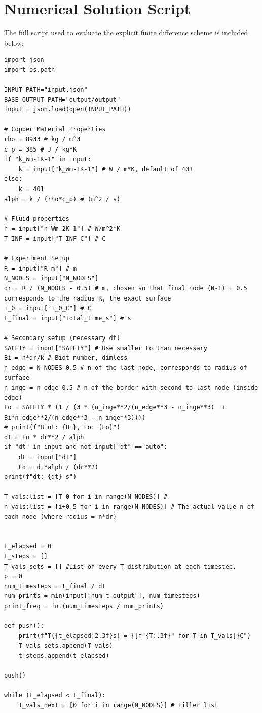 \documentclass[12pt]{article}
\begin{document}
\section{Numerical Solution Script}\label{app:efd-script}
The full \Python script used to evaluate the explicit finite difference scheme is included below:
\begin{verbatim}
import json
import os.path

INPUT_PATH="input.json"
BASE_OUTPUT_PATH="output/output"
input = json.load(open(INPUT_PATH))

# Copper Material Properties
rho = 8933 # kg / m^3
c_p = 385 # J / kg*K
if "k_Wm-1K-1" in input:
    k = input["k_Wm-1K-1"] # W / m*K, default of 401
else:
    k = 401
alph = k / (rho*c_p) # (m^2 / s)

# Fluid properties
h = input["h_Wm-2K-1"] # W/m^2*K
T_INF = input["T_INF_C"] # C

# Experiment Setup
R = input["R_m"] # m
N_NODES = input["N_NODES"]
dr = R / (N_NODES - 0.5) # m, chosen so that final node (N-1) + 0.5 corresponds to the radius R, the exact surface  
T_0 = input["T_0_C"] # C
t_final = input["total_time_s"] # s

# Secondary setup (necessary dt)
SAFETY = input["SAFETY"] # Use smaller Fo than necessary
Bi = h*dr/k # Biot number, dimless
n_edge = N_NODES-0.5 # n of the last node, corresponds to radius of surface
n_inge = n_edge-0.5 # n of the border with second to last node (inside edge)
Fo = SAFETY * (1 / (3 * (n_inge**2/(n_edge**3 - n_inge**3)  +  Bi*n_edge**2/(n_edge**3 - n_inge**3))))
# print(f"Biot: {Bi}, Fo: {Fo}")
dt = Fo * dr**2 / alph
if "dt" in input and not input["dt"]=="auto":
    dt = input["dt"]
    Fo = dt*alph / (dr**2)
print(f"dt: {dt} s")

T_vals:list = [T_0 for i in range(N_NODES)] #
n_vals:list = [i+0.5 for i in range(N_NODES)] # The actual value n of each node (where radius = n*dr)


t_elapsed = 0
t_steps = []
T_vals_sets = [] #List of every T distribution at each timestep.
p = 0
num_timesteps = t_final / dt
num_prints = min(input["num_t_output"], num_timesteps)
print_freq = int(num_timesteps / num_prints)

def push():
    print(f"T({t_elapsed:2.3f}s) = {[f"{T:.3f}" for T in T_vals]}C")
    T_vals_sets.append(T_vals)
    t_steps.append(t_elapsed)

push()

while (t_elapsed < t_final):
    T_vals_next = [0 for i in range(N_NODES)] # Filler list
    

\end{verbatim}
\end{document}

